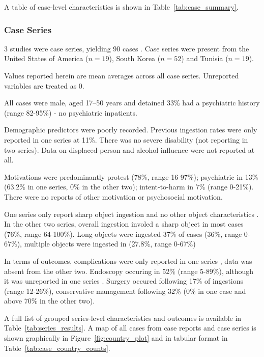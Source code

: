 A table of case-level characteristics is shown in Table~\ref{tab:case_summary}. 

\subsubsection*{Case Series}

3 studies were case series, yielding 90 cases \cite{Elghali_2016, Karp_1991b, Lee_2007}. Case series were present from the United States of America \cite{Karp_1991b} ($n = 19$), South Korea \cite{Lee_2007} ($n = 52$) and Tunisia \cite{Elghali_2016} ($n = 19$).

Values reported herein are mean averages across all case series. Unreported variables are treated as 0.

All cases were male, aged 17--50 years and detained 33\% had a psychiatric history (range 82-95\%) - no psychiatric inpatients. 

Demographic predictors were poorly recorded. Previous ingestion rates were only reported in one series at 11\%. There was no severe disability (not reporting in two series). Data on displaced person and alcohol influence were not reported at all.

Motivations were predominantly protest (78\%, range 16-97\%); psychiatric in 13\% (63.2\% in one series, 0\% in the other two); intent-to-harm in 7\% (range 0-21\%). There were no reports of other motivation or psychosocial motivation. 

One series only report sharp object ingestion and no other object characteristics \cite{Karp_1991b}. In the other two series, overall ingestion involed a sharp object in most cases (76\%, range 64-100\%). Long objects were ingested 37\% of cases (36\%, range 0-67\%), multiple objects were ingested in (27.8\%, range 0-67\%)

In terms of outcomes, complications were only reported in one series \cite{Lee_2007}, data was absent from the other two. Endoscopy occuring in 52\% (range 5-89\%), although it was unreported in one series \cite{Karp_1991b}. Surgery occured following 17\% of ingestions (range 12-26\%), conservative management following 32\% (0\% in one case and above 70\% in the other two).

A full list of grouped series-level characteristics and outcomes is available in Table~\ref{tab:series_results}. A map of all cases from case reports and case series is shown graphically in Figure~\ref{fig:country_plot} and in tabular format in Table~\ref{tab:case_country_counts}.